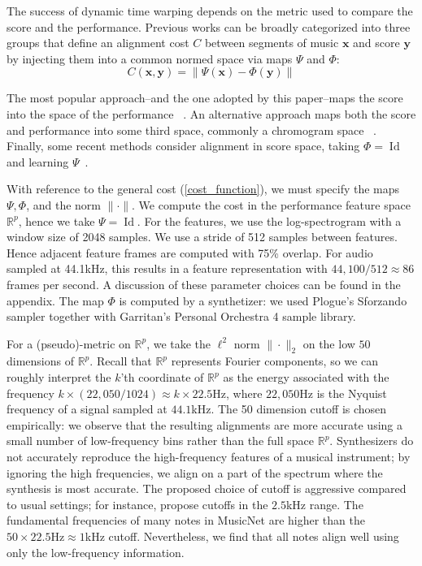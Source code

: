 \documentclass{article} \usepackage{iclr2017_conference,times}
\DeclareMathOperator{\id}{Id}
\begin{document}
The success of dynamic time warping depends on the metric used to compare the score and the performance. Previous works can be broadly categorized into three groups that define an alignment cost $C$ between segments of music $\textbf{x}$ and score $\textbf{y}$ by injecting them into a common normed space via maps $\Psi$ and $\Phi$:
\begin{equation}\label{cost_function}
C(\textbf{x},\textbf{y}) = \|\Psi (\textbf{x}) - \Phi (\textbf{y})\|
\end{equation}

The most popular approach--and the one adopted by this paper--maps the score into the space of the performance ~\citep{orio,turetsky,soulez}. An alternative approach maps both the score and performance into some third space, commonly a chromogram space ~\citep{dannenberg,izmirli,joder}. Finally, some recent methods consider alignment in score space, taking $\Phi = \id$ and learning $\Psi$~\citep{garreau,lajugie}.

With reference to the general cost (\ref{cost_function}), we must specify the maps $\Psi,\Phi$, and the norm $\|\cdot\|$. We compute the cost in the performance feature space $\mathbb{R}^p$, hence we take $\Psi = \id$. For the features, we use the log-spectrogram with a window size of 2048 samples. We use a stride of 512 samples between features. Hence adjacent feature frames are computed with 75\% overlap. For audio sampled at 44.1kHz, this results in a feature representation with $44,100/512 \approx 86$ frames per second. A discussion of these parameter choices can be found in the appendix. The map $\Phi$ is computed by a synthetizer: we used Plogue's Sforzando sampler together with Garritan's Personal Orchestra 4 sample library.



For a (pseudo)-metric on $\mathbb{R}^p$, we take the $\ell^2$ norm $\|\cdot\|_2$ on the low $50$ dimensions of $\mathbb{R}^p$. Recall that $\mathbb{R}^p$ represents Fourier components, so we can roughly interpret the $k$'th coordinate of $\mathbb{R}^p$ as the energy associated with the frequency $k \times \left(22,050/1024\right) \approx k \times 22.5$Hz, where $22,050$Hz is the Nyquist frequency of a signal sampled at $44.1$kHz. The 50 dimension cutoff is chosen empirically: we observe that the resulting alignments are more accurate using a small number of low-frequency bins rather than the full space $\mathbb{R}^p$. Synthesizers do not accurately reproduce the high-frequency features of a musical instrument; by ignoring the high frequencies, we align on a part of the spectrum where the synthesis is most accurate. The proposed choice of cutoff is aggressive compared to usual settings; for instance, \cite{turetsky} propose cutoffs in the $2.5$kHz range. The fundamental frequencies of many notes in MusicNet are higher than the $50\times 22.5\text{Hz} \approx 1$kHz cutoff. Nevertheless, we find that all notes align well using only the low-frequency information.
\end{document}
